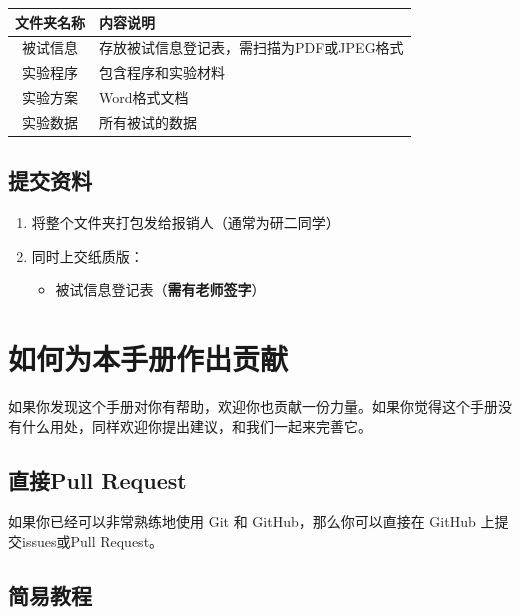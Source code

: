 \documentclass[]{ctexbook}
\providecommand{\tightlist}{%
  \setlength{\itemsep}{0pt}\setlength{\parskip}{0pt}}
\theoremstyle{definition}
\theoremstyle{definition}
\theoremstyle{definition}
\theoremstyle{definition}
\theoremstyle{remark}
\begin{document}
\begin{longtable}[]{@{}cl@{}}
\toprule\noalign{}
文件夹名称 & 内容说明 \\
\midrule\noalign{}
\endhead
\bottomrule\noalign{}
\endlastfoot
被试信息 & 存放被试信息登记表，需扫描为PDF或JPEG格式 \\
实验程序 & 包含程序和实验材料 \\
实验方案 & Word格式文档 \\
实验数据 & 所有被试的数据 \\
\end{longtable}

\section{提交资料}\label{ux63d0ux4ea4ux8d44ux6599}

\begin{enumerate}
\def\labelenumi{\arabic{enumi}.}
\tightlist
\item
  将整个文件夹打包发给报销人（通常为研二同学）
\item
  同时上交纸质版：

  \begin{itemize}
  \tightlist
  \item
    被试信息登记表（\textbf{需有老师签字}）
  \end{itemize}
\end{enumerate}

\cleardoublepage

\appendix {}


\chapter{如何为本手册作出贡献}\label{contribute}

如果你发现这个手册对你有帮助，欢迎你也贡献一份力量。如果你觉得这个手册没有什么用处，同样欢迎你提出建议，和我们一起来完善它。

\section{直接Pull Request}\label{ux76f4ux63a5pull-request}

如果你已经可以非常熟练地使用 Git 和 GitHub，那么你可以直接在 GitHub 上提交issues或Pull Request。

\section{简易教程}\label{ux7b80ux6613ux6559ux7a0b}
\end{document}
